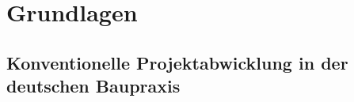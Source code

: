 \chapter{Grundlagen}
\label{ch:grundlagen}


\section{Konventionelle Projektabwicklung in der deutschen Baupraxis}
\label{sec: 2.1}

%
%
%
%
